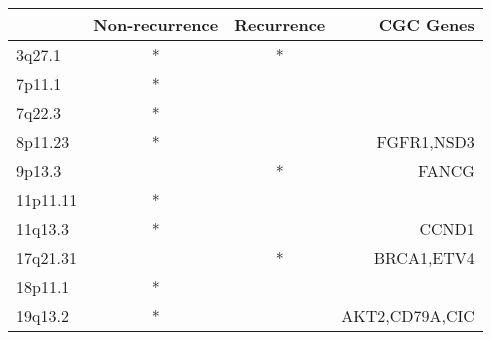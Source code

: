 \begin{tabular}{lccr}
\toprule
{} & Non-recurrence & Recurrence &       CGC Genes \\
\midrule
3q27.1   &              * &          * &                 \\
7p11.1   &              * &            &                 \\
7q22.3   &              * &            &                 \\
8p11.23  &              * &            &      FGFR1,NSD3 \\
9p13.3   &                &          * &           FANCG \\
11p11.11 &              * &            &                 \\
11q13.3  &              * &            &           CCND1 \\
17q21.31 &                &          * &      BRCA1,ETV4 \\
18p11.1  &              * &            &                 \\
19q13.2  &              * &            &  AKT2,CD79A,CIC \\
\bottomrule
\end{tabular}
